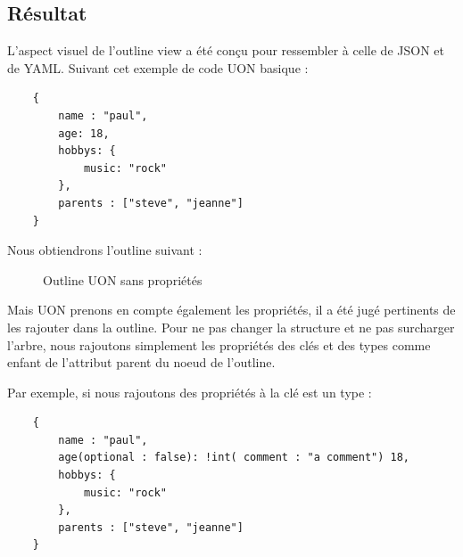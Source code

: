\documentclass[
    iict, %
    il, %
]{heig-tb}
\begin{document}
\subsection{Résultat}
L'aspect visuel de l'outline view a été conçu pour ressembler à celle de JSON et de YAML.
Suivant cet exemple de code UON basique :

\begin{lstlisting}
    {
        name : "paul",
        age: 18,
        hobbys: {
            music: "rock"
        },
        parents : ["steve", "jeanne"]
    }
\end{lstlisting}

Nous obtiendrons l'outline suivant :

\begin{figure}[!h]
    \begin{center}
    \end{center}
    \caption[Outline UON sans propriétés]{\label{uon-payload-outline-without-properties} Outline UON sans propriétés}
\end{figure}

Mais UON prenons en compte également les propriétés, il a été jugé pertinents de les rajouter dans la outline.
Pour ne pas changer la structure et ne pas surcharger l'arbre,
nous rajoutons simplement les propriétés des clés et des types comme enfant de l'attribut parent du noeud de l'outline.

Par exemple, si nous rajoutons des propriétés à la clé est un type :
\begin{lstlisting}
    {
        name : "paul",
        age(optional : false): !int( comment : "a comment") 18,
        hobbys: {
            music: "rock"
        },
        parents : ["steve", "jeanne"]
    }
\end{lstlisting}
\end{document}
